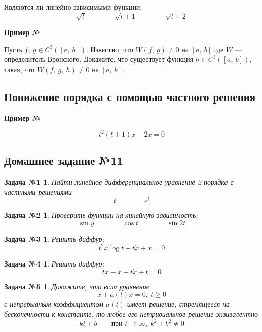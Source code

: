 \documentclass[a4paper,12pt]{article}
\newtheorem*{task1}{Задача №1}
\newtheorem*{task2}{Задача №2}
\newtheorem*{task3}{Задача №3}
\newtheorem*{task4}{Задача №4}
\newtheorem*{task5}{Задача №5}
\newcommand{\dx}{\dot{x}}
\newcommand{\ddx}{\ddot{x}}
\newcommand{\dddx}{\dddot{x}}
\renewcommand{\to}{\longrightarrow}
\begin{document}
Являются ли линейно зависимыми функции:
\[\sqrt{t}\qquad \qquad \sqrt{t + 1} \qquad \qquad \sqrt{t + 2}\]

\textbf{Пример №}

Пусть $f,\ g \in C^3([a,\ b])$.
Известно, что $W(f,\ g) \neq 0$ на $[a,\ b]$ где $W$ --- определитель Вронского. 
Докажите, что существует функция $h \in C^3([a,\ b])$, такая, что $W(f,\ g,\ h) \neq 0$ на $[a,\ b]$.

\subsection{Понижение порядка с помощью частного решения}

\textbf{Пример №}

\[t^2(t + 1)\ddx - 2x = 0\]

\subsection{Домашнее задание №11}


\begin{task1}
	Найти линейное дифференциальное уравнение 2 порядка с частными решениями
	\[t \qquad\qquad e^t\]
\end{task1}
%

\begin{task2}
	Проверить функции на линейную зависимость:
	\[\sin y \qquad \qquad \cos t \qquad \qquad \sin  2t\]
\end{task2}
%

\begin{task3}
	Решить диффур:
	\[t^2\ddx \log t - t\dx + x = 0\]
\end{task3}
%	

\begin{task4}
	Решить диффур:
	\[t\dddx -\ddx - t\dx + t = 0\]
\end{task4}
%

\begin{task5}
	Докажите, что если уравнение
	\[\ddx + a(t)x = 0,\ t \geqslant 0\]
	с непрерывным коэффициентом $a(t)$ имеет решение, стремящееся на бесконечности к константе, то любое его нетривиальное решение эквивалентно
	\[kt + b\qquad \text{при } t \to \infty,\ k^2 + b^2 \neq 0\]
\end{task5}
%
\end{document}
